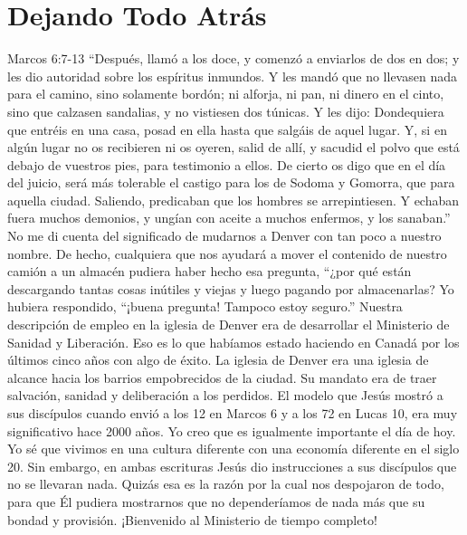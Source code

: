 \documentclass[twoside, 12pt]{book}
\begin{document}
\section{Dejando Todo Atrás}

Marcos 6:7-13 “Después, llamó a los doce, y comenzó a enviarlos de dos en dos; y les dio autoridad sobre los espíritus inmundos. Y les mandó que no llevasen nada para el camino, sino solamente bordón; ni alforja, ni pan, ni dinero en el cinto, sino que calzasen sandalias, y no vistiesen dos túnicas. Y les dijo: Dondequiera que entréis en una casa, posad en ella hasta que salgáis de aquel lugar.  Y, si en algún lugar no os recibieren ni os oyeren, salid de allí, y sacudid el polvo que está debajo de vuestros pies, para testimonio a ellos. De cierto os digo que en el día del juicio, será más tolerable el castigo para los de Sodoma y Gomorra, que para aquella ciudad.  Saliendo, predicaban que los hombres se arrepintiesen.  Y echaban fuera muchos demonios, y ungían con aceite a muchos enfermos, y los sanaban.”
No me di cuenta del significado de mudarnos a Denver con tan poco a nuestro nombre. De hecho, cualquiera que nos ayudará a mover el contenido de nuestro camión a un almacén pudiera haber hecho esa pregunta, “¿por qué están descargando tantas cosas inútiles y viejas y luego pagando por almacenarlas? Yo hubiera respondido, “¡buena pregunta! Tampoco estoy seguro.” Nuestra descripción de empleo en la iglesia de Denver era de desarrollar el Ministerio de Sanidad y Liberación. Eso es lo que habíamos estado haciendo en Canadá por los últimos cinco años con algo de éxito. La iglesia de Denver era una iglesia de alcance hacia los barrios empobrecidos de la ciudad. Su mandato era de traer salvación, sanidad y deliberación a los perdidos. El modelo que Jesús mostró a sus discípulos cuando envió a los 12 en Marcos 6 y a los 72 en Lucas 10, era muy significativo hace 2000 años. Yo creo que es igualmente importante el día de hoy. Yo sé que vivimos en una cultura diferente con una economía diferente en el siglo 20. Sin embargo, en ambas escrituras Jesús dio instrucciones a sus discípulos que no se llevaran nada. Quizás esa es la razón por la cual nos despojaron de todo, para que Él pudiera mostrarnos que no dependeríamos de nada más que su bondad y provisión. ¡Bienvenido al Ministerio de tiempo completo!\\
\end{document}
